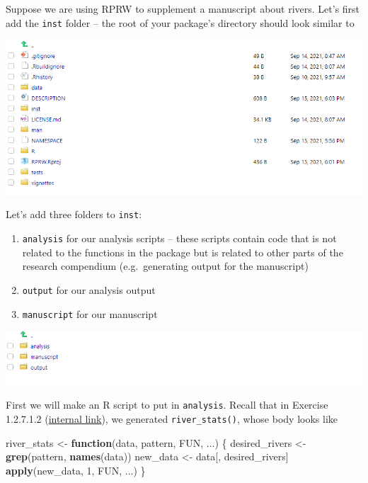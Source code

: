 \documentclass[
]{book}
\newenvironment{Shaded}{\begin{snugshade}}{\end{snugshade}}
\newcommand{\ControlFlowTok}[1]{\textcolor[rgb]{0.13,0.29,0.53}{\textbf{#1}}}
\newcommand{\DecValTok}[1]{\textcolor[rgb]{0.00,0.00,0.81}{#1}}
\newcommand{\KeywordTok}[1]{\textcolor[rgb]{0.13,0.29,0.53}{\textbf{#1}}}
\newcommand{\NormalTok}[1]{#1}
\newcommand{\StringTok}[1]{\textcolor[rgb]{0.31,0.60,0.02}{#1}}
\providecommand{\tightlist}{%
  \setlength{\itemsep}{0pt}\setlength{\parskip}{0pt}}
\begin{document}
Suppose we are using RPRW to supplement a manuscript about rivers. Let's first add the \texttt{inst} folder -- the root of your package's directory should look similar to

\includegraphics[width=1\linewidth]{images/newrpack_files9}

Let's add three folders to \texttt{inst}:

\begin{enumerate}
\def\labelenumi{\arabic{enumi}.}
\tightlist
\item
  \texttt{analysis} for our analysis scripts -- these scripts contain code that is not related to the functions in the package but is related to other parts of the research compendium (e.g.~generating output for the manuscript)
\item
  \texttt{output} for our analysis output
\item
  \texttt{manuscript} for our manuscript
\end{enumerate}

\includegraphics[width=1\linewidth]{images/newrpack_files10}

First we will make an R script to put in \texttt{analysis}. Recall that in Exercise 1.2.7.1.2 (\protect\hyperlink{ex-set3}{internal link}), we generated \texttt{river\_stats()}, whose body looks like

\begin{Shaded}
\begin{Highlighting}[]
\NormalTok{river_stats <-}\StringTok{ }\ControlFlowTok{function}\NormalTok{(data, pattern, FUN, ...) \{}
\NormalTok{  desired_rivers <-}\StringTok{ }\KeywordTok{grep}\NormalTok{(pattern, }\KeywordTok{names}\NormalTok{(data))}
\NormalTok{  new_data <-}\StringTok{ }\NormalTok{data[, desired_rivers]}
  \KeywordTok{apply}\NormalTok{(new_data, }\DecValTok{1}\NormalTok{, FUN, ...)}
\NormalTok{\}}
\end{Highlighting}
\end{Shaded}
\end{document}
